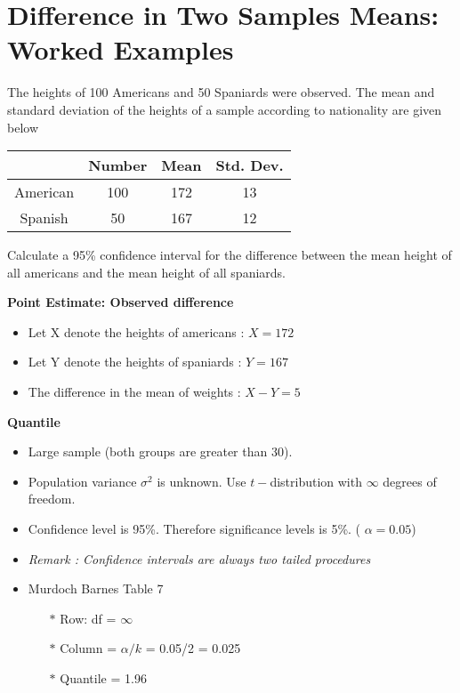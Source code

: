 \documentclass[a4paper,12pt]{article}
\begin{document}
\section*{Difference in Two Samples Means: Worked Examples}

The heights of 100 Americans and 50 Spaniards were observed.
The mean and standard deviation of the heights of a sample according to nationality are given below

\begin{center}
\begin{tabular}{|c|c|c|c|} \hline
& Number & Mean & Std. Dev. \\ \hline
American& 100&172&13\\ \hline
Spanish & 50 & 167 & 12\\ \hline
\end{tabular}     
\end{center}


\noindent Calculate a 95\% confidence interval for the difference between the mean height of all americans and the mean height of all spaniards.


\noindent \textbf{Point Estimate: Observed difference}

\begin{itemize}
	\item Let X denote the heights of americans : $X= 172$
	\item Let Y denote the heights of spaniards : $Y= 167$
	
	\item The difference in the mean of weights : $X-Y= 5$
\end{itemize}


\noindent \textbf{Quantile}

\begin{itemize}
	\item Large sample (both groups are greater than 30).
	
	\item Population variance $\sigma^2$ is unknown. Use $t-$distribution with $\infty$ degrees of freedom.
\end{itemize}


\begin{itemize}
	\item Confidence level is 95\%. Therefore significance levels is 5\%. ( $\alpha =0.05$)
	\item \textit{Remark : Confidence intervals are always two tailed procedures}
	
\item Murdoch Barnes Table 7

\begin{itemize}
	\item[$\ast$] Row: df =  $\infty$
	\item[$\ast$] Column = $\alpha/k$ = 0.05/2 = 0.025
	\item[$\ast$] Quantile =  1.96
\end{itemize}
\end{itemize}
\end{document}
